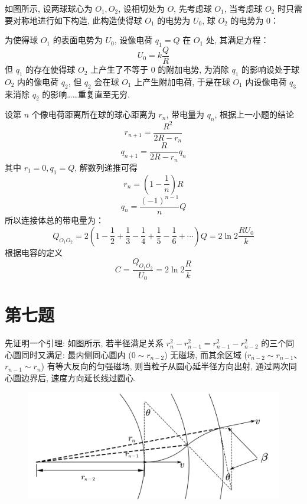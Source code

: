 \documentclass[12pt,a4paper]{article}
\begin{document}
	如图所示, 设两球球心为 $O_1, O_2$, 设相切处为 $O$, 先考虑球 $O_1$, 当考虑球 $O_2$ 时只需要对称地进行如下构造, 此构造使得球 $O_1$ 的电势为 $U_0$, 球 $O_2$ 的电势为 0：
	
		为使得球 $O_1$ 的表面电势为 $U_0$, 设像电荷 $q_1=Q$ 在 $O_1$ 处, 其满足方程：
	\begin{equation}
		U_0=k\dfrac{Q}{R}
	\end{equation}
	但 $q_1$ 的存在使得球 $O_2$ 上产生了不等于 0 的附加电势, 为消除 $q_1$ 的影响设处于球 $O_2$ 内的像电荷 $q_2$, 但 $q_2$ 会在球 $O_1$ 上产生附加电荷, 于是在球 $O_1$ 内设像电荷 $q_3$ 来消除 $q_2$ 的影响……重复直至无穷.
	
	设第 $n$ 个像电荷距离所在球的球心距离为 $r_n$, 带电量为 $q_n$, 根据上一小题的结论
	\begin{equation}
		r_{n+1}=\dfrac{R^2}{2R-r_n}
	\end{equation}
	\begin{equation}
		q_{n+1}=\dfrac{R}{2R-r_n}q_n
	\end{equation}
	其中 $r_1=0, q_1=Q$, 解数列递推可得
	\begin{equation}
		r_n=\left(1-\dfrac{1}{n} \right)R 
	\end{equation}
	\begin{equation}
		q_n=\dfrac{(-1)^{n-1}}{n}Q
	\end{equation}
	所以连接体总的带电量为：
	\begin{equation}
		Q_{O_1O_2}=2\left( 1-\dfrac{1}{2}+\dfrac{1}{3}-\dfrac{1}{4}+\dfrac{1}{5}-\dfrac{1}{6}+\cdots\right)Q=2\ln2\dfrac{RU_0}{k}
	\end{equation}
	根据电容的定义
	$$
	C=\dfrac{Q_{O_1O_2}}{U_0}=2\ln2\dfrac{R}{k}
	$$
	\section*{第七题}
	先证明一个引理: 如图所示, 若半径满足关系 $r_n^2-r_{n-1}^2=r_{n-1}^2-r_{n-2}^2$ 的三个同心圆同时又满足: 最内侧同心圆内 ($0\sim r_{n-2}$) 无磁场, 而其余区域 ($r_{n-2}\sim r_{n-1}$、$r_{n-1}\sim r_{n}$) 有等大反向的匀强磁场, 则当粒子从圆心延半径方向出射, 通过两次同心圆边界后, 速度方向延长线过圆心.
	\begin{figure}[H]
		\centering
		\includegraphics[width=0.9\linewidth]{../EarlyPic/Tiny_explain}
		\caption*{}
		\label{fig:tinyexplain}
	\end{figure}
	
\end{document}
